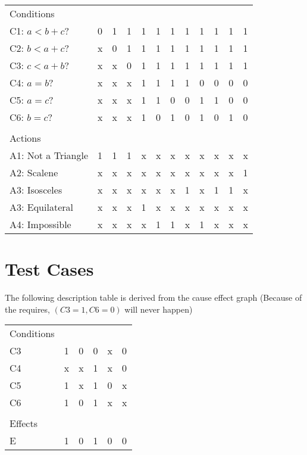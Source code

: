 \documentclass[letterpaper]{article}
\begin{document}
\begin{adjustbox}{center}
	\begin{tabular}{llllllllllll}
		Conditions         &   &   &   &   &   &   &   &   &   &   &   \\ \cline{1-1}
		C1: $a<b+c$?       & 0 & 1 & 1 & 1 & 1 & 1 & 1 & 1 & 1 & 1 & 1 \\
		C2: $b<a+c$?       & x & 0 & 1 & 1 & 1 & 1 & 1 & 1 & 1 & 1 & 1 \\
		C3: $c<a+b$?       & x & x & 0 & 1 & 1 & 1 & 1 & 1 & 1 & 1 & 1 \\
		C4: $a=b$?         & x & x & x & 1 & 1 & 1 & 1 & 0 & 0 & 0 & 0 \\
		C5: $a=c$?         & x & x & x & 1 & 1 & 0 & 0 & 1 & 1 & 0 & 0 \\
		C6: $b=c$?         & x & x & x & 1 & 0 & 1 & 0 & 1 & 0 & 1 & 0 \\
		                   &   &   &   &   &   &   &   &   &   &   &   \\
		Actions            &   &   &   &   &   &   &   &   &   &   &   \\ \cline{1-1}
		A1: Not a Triangle & 1 & 1 & 1 & x & x & x & x & x & x & x & x \\
		A2: Scalene        & x & x & x & x & x & x & x & x & x & x & 1 \\
		A3: Isosceles      & x & x & x & x & x & x & 1 & x & 1 & 1 & x \\
		A3: Equilateral    & x & x & x & 1 & x & x & x & x & x & x & x \\
		A4: Impossible     & x & x & x & x & 1 & 1 & x & 1 & x & x & x \\
	\end{tabular}
\end{adjustbox}


\section{Test Cases}
The following description table is derived from the cause effect graph
(Because of the requires, $(C3=1, C6=0)$ will never happen)
\vspace{20pt}

\begin{adjustbox}{center}
	\begin{tabular}{llllll}
		Conditions &   &   &   &   &   \\ \cline{1-1}
		C3         & 1 & 0 & 0 & x & 0 \\
		C4         & x & x & 1 & x & 0 \\
		C5         & 1 & x & 1 & 0 & x \\
		C6         & 1 & 0 & 1 & x & x \\
		           &   &   &   &   &   \\
		Effects    &   &   &   &   &   \\ \cline{1-1}
		E          & 1 & 0 & 1 & 0 & 0 \\
	\end{tabular}
\end{adjustbox}
\vspace{20pt}
\end{document}
